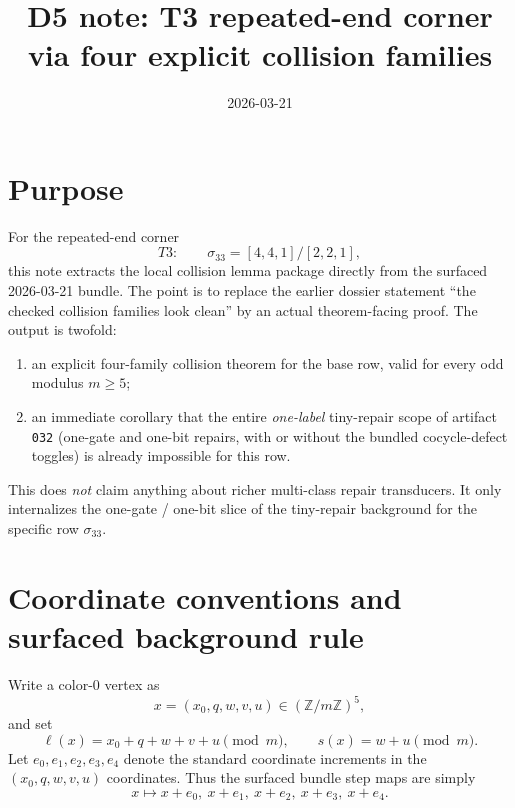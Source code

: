\documentclass[11pt]{article}
\title{D5 note: T3 repeated-end corner via four explicit collision families}
\author{}
\date{2026-03-21}
\newcommand{\eX}{e_0}
\newcommand{\eQ}{e_1}
\newcommand{\eW}{e_2}
\newcommand{\eV}{e_3}
\newcommand{\eU}{e_4}
\begin{document}
\maketitle

\section*{Purpose}

For the repeated-end corner
\[
T3:\qquad \sigma_{33}=[4,4,1]/[2,2,1],
\]
this note extracts the local collision lemma package directly from the surfaced
2026-03-21 bundle.
The point is to replace the earlier dossier statement
``the checked collision families look clean'' by an actual theorem-facing proof.
The output is twofold:
\begin{enumerate}
\item an explicit four-family collision theorem for the base row, valid for every
odd modulus $m\ge 5$;
\item an immediate corollary that the entire \emph{one-label} tiny-repair scope of
artifact \texttt{032} (one-gate and one-bit repairs, with or without the bundled
cocycle-defect toggles) is already impossible for this row.
\end{enumerate}

This does \emph{not} claim anything about richer multi-class repair transducers.
It only internalizes the one-gate / one-bit slice of the tiny-repair background
for the specific row $\sigma_{33}$.

\section*{Coordinate conventions and surfaced background rule}

Write a color-$0$ vertex as
\[
x=(x_0,q,w,v,u)\in (\mathbb Z/m\mathbb Z)^5,
\]
and set
\[
\ell(x)=x_0+q+w+v+u \pmod m,
\qquad
s(x)=w+u \pmod m.
\]
Let $\eX,\eQ,\eW,\eV,\eU$ denote the standard coordinate increments in the
$(x_0,q,w,v,u)$ coordinates.
Thus the surfaced bundle step maps are simply
\[
x\mapsto x+\eX,\ x+\eQ,\ x+\eW,\ x+\eV,\ x+\eU.
\]
\end{document}
